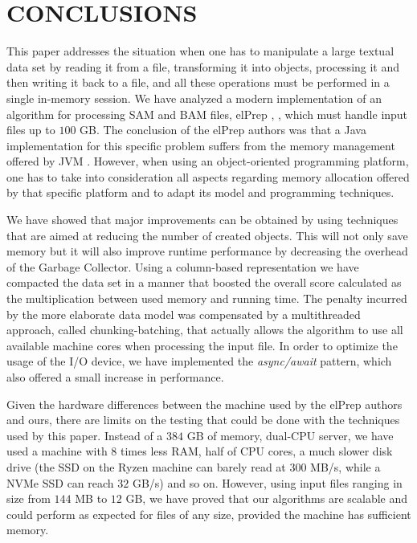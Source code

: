 \documentclass[a4paper,twoside]{article}
\begin{document}
\section{\uppercase{Conclusions}}
\label{sec:conclusions}
This paper addresses the situation when one has to manipulate a large textual data set by reading it from a file, transforming it into objects, processing it and then writing it back to a file, and all these operations must be performed in a single in-memory session.
We have analyzed a modern implementation of an algorithm for processing SAM and BAM files, elPrep \cite{herzeel:2015}, \cite{herzeel:2019}, which must handle input files up to $100$ GB.
The conclusion of the elPrep authors was that a Java implementation for this specific problem suffers from the memory management offered by JVM \cite{costanza:2019}.
However, when using an object-oriented programming platform, one has to take into consideration all aspects regarding memory allocation offered by that specific platform and to adapt its model and programming techniques.

We have showed that major improvements can be obtained by using techniques that are aimed at reducing the number of created objects.
This will not only save memory but it will also improve runtime performance by decreasing the overhead of the Garbage Collector.
Using a column-based representation we have compacted the data set in a manner that boosted the overall score calculated as the multiplication between used memory and running time.
The penalty incurred by the more elaborate data model was compensated by a multithreaded approach, called chunking-batching, that actually allows the algorithm to use all available machine cores when processing the input file.
In order to optimize the usage of the I/O device, we have implemented the {\textit{async/await} } pattern, which also offered a small increase in performance.

Given the hardware differences between the machine used by the elPrep authors and ours, there are limits on the testing that could be done with the techniques used by this paper.
Instead of a $384$ GB of memory, dual-CPU server, we have used a machine  with $8$ times less RAM, half of CPU cores, a much slower disk drive (the SSD on the Ryzen machine can barely read at 300 MB/s, while a NVMe SSD can reach $32$ GB/s) and so on.
However, using input files ranging in size from $144$ MB to $12$ GB, we have proved that our algorithms are scalable and could perform as expected for files of any size, provided the machine has sufficient memory.






{\small
}
\end{document}
